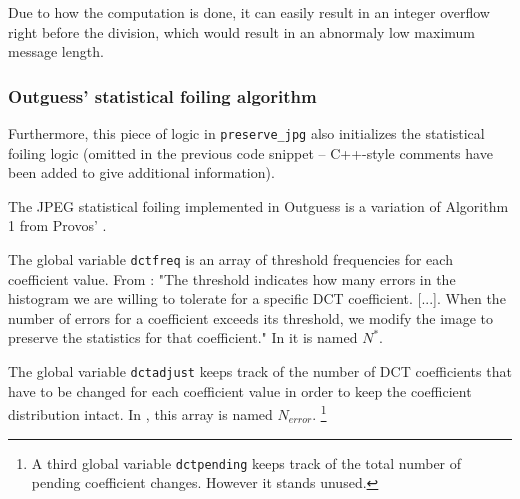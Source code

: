 \documentclass{article}
\begin{document}
Due to how the computation is done, it can easily result in an integer overflow right before the division, which would result in an abnormaly low maximum message length.

\subsubsection{Outguess' statistical foiling algorithm}

Furthermore, this piece of logic in \texttt{preserve\_jpg} also initializes the statistical foiling logic (omitted in the previous code snippet -- C++-style comments have been added to give additional information).

The JPEG statistical foiling implemented in Outguess is a variation of Algorithm 1 from Provos' \cite{def01}.

The global variable \texttt{dctfreq} is an array of threshold frequencies for each coefficient value. From \cite{def01}: "The threshold indicates how many errors in the histogram we are willing to tolerate for a specific DCT coefficient. [...]. When the number of errors for a coefficient exceeds its threshold, we modify the image to preserve the statistics for that coefficient." In \cite{def01} it is named $N^\ast$.

The global variable \texttt{dctadjust} keeps track of the number of DCT coefficients that have to be changed for each coefficient value in order to keep the coefficient distribution intact. In \cite{def01}, this array is named $N_{error}$. \footnote{A third global variable \texttt{dctpending} keeps track of the total number of pending coefficient changes. However it stands unused.}
\end{document}
